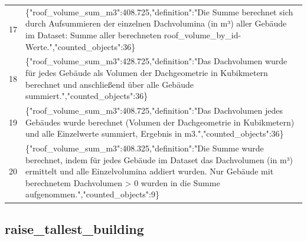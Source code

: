 \documentclass[a4paper,11pt]{article}
\begin{document}
\begin{table}[ht]
\begin{tabular}{r p{12cm}}
17 & \{"roof\_volume\_sum\_m3":408.725,"definition":"Die Summe berechnet sich durch Aufsummieren der einzelnen Dachvolumina (in m³) aller Gebäude im Dataset: Summe aller berechneten roof\_volume\_by\_id-Werte.","counted\_objects":36\} \\
18 & \{"roof\_volume\_sum\_m3":428.725,"definition":"Das Dachvolumen wurde für jedes Gebäude als Volumen der Dachgeometrie in Kubikmetern berechnet und anschließend über alle Gebäude summiert.","counted\_objects":36\} \\
19 & \{"roof\_volume\_sum\_m3":408.725,"definition":"Das Dachvolumen jedes Gebäudes wurde berechnet (Volumen der Dachgeometrie in Kubikmetern) und alle Einzelwerte summiert, Ergebnis in m3.","counted\_objects":36\} \\
20 & \{"roof\_volume\_sum\_m3":408.325,"definition":"Die Summe wurde berechnet, indem für jedes Gebäude im Dataset das Dachvolumen (in m³) ermittelt und alle Einzelvolumina addiert wurden. Nur Gebäude mit berechnetem Dachvolumen > 0 wurden in die Summe aufgenommen.","counted\_objects":9\} \\
\hline
\end{tabular}
\end{table}

\clearpage
\subsection{raise\_tallest\_building}
\end{document}

